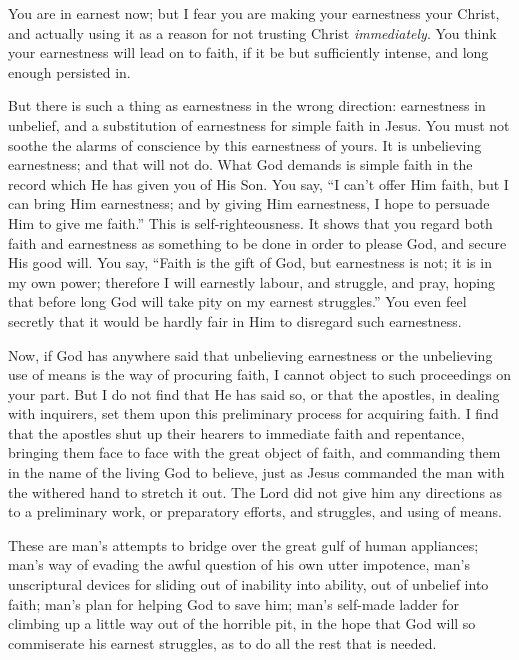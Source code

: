 \documentclass[
]{book}
\begin{document}
You are in earnest now; but I fear you are making your earnestness your Christ, and actually using it as a reason for not trusting Christ \emph{immediately}. You think your earnestness will lead on to faith, if it be but sufficiently intense, and long enough persisted in.

But there is such a thing as earnestness in the wrong direction: earnestness in unbelief, and a substitution of earnestness for simple faith in Jesus. You must not soothe the alarms of conscience by this earnestness of yours. It is unbelieving earnestness; and that will not do. What God demands is simple faith in the record which He has given you of His Son. You say, ``I can't offer Him faith, but I can bring Him earnestness; and by giving Him earnestness, I hope to persuade Him to give me faith.'' This is self-righteousness. It shows that you regard both faith and earnestness as something to be done in order to please God, and secure His good will. You say, ``Faith is the gift of God, but earnestness is not; it is in my own power; therefore I will earnestly labour, and struggle, and pray, hoping that before long God will take pity on my earnest struggles.'' You even feel secretly that it would be hardly fair in Him to disregard such earnestness.

Now, if God has anywhere said that unbelieving earnestness or the unbelieving use of means is the way of procuring faith, I cannot object to such proceedings on your part. But I do not find that He has said so, or that the apostles, in dealing with inquirers, set them upon this preliminary process for acquiring faith. I find that the apostles shut up their hearers to immediate faith and repentance, bringing them face to face with the great object of faith, and commanding them in the name of the living God to believe, just as Jesus commanded the man with the withered hand to stretch it out. The Lord did not give him any directions as to a preliminary work, or preparatory efforts, and struggles, and using of means.

These are man's attempts to bridge over the great gulf of human appliances; man's way of evading the awful question of his own utter impotence, man's unscriptural devices for sliding out of inability into ability, out of unbelief into faith; man's plan for helping God to save him; man's self-made ladder for climbing up a little way out of the horrible pit, in the hope that God will so commiserate his earnest struggles, as to do all the rest that is needed.
\end{document}
